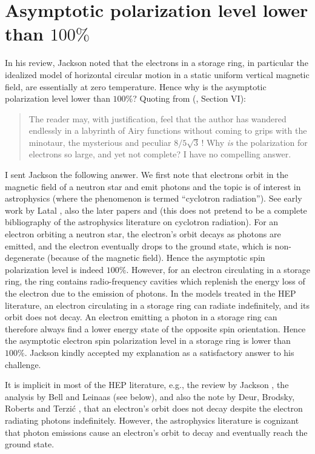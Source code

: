 \documentclass[review]{elsarticle}
\theoremstyle{plain}
\begin{document}
\section{Asymptotic polarization level lower than $100\%$}\label{sec:Plt1}
In his review, Jackson \cite{JacksonRMP} noted that the electrons in a storage ring,
in particular the idealized model of horizontal circular motion in a static uniform vertical magnetic field,
are essentially at zero temperature.
Hence why is the asymptotic polarization level lower than $100\%$?
Quoting from (\cite{JacksonRMP}, Section VI):
\begin{quote}
  The reader may, with justification, feel that the author has wandered endlessly in a labyrinth of Airy functions without coming to grips with the minotaur,
  the mysterious and peculiar $8/5\sqrt{3}$\,! Why \emph{is} the polarization for electrons so large, and yet not complete? I have no compelling answer.
\end{quote}
I sent Jackson the following answer.
We first note that electrons orbit in the magnetic field of a neutron star and emit photons
and the topic is of interest in astrophysics (where the phenomenon is termed ``cyclotron radiation'').
See early work by Latal \cite{Latal}, also the later papers \cite{BaringAstro} and \cite{SemionovaAstro}
(this does not pretend to be a complete bibliography of the astrophysics literature on cyclotron radiation).
For an electron orbiting a neutron star, the electron's orbit decays as photons are emitted, and the electron eventually drops to the ground state,
which is non-degenerate (because of the magnetic field).
Hence the asymptotic spin polarization level is indeed $100\%$.
However, for an electron circulating in a storage ring,
the ring contains radio-frequency cavities which replenish the energy loss of the electron due to the emission of photons.
In the models treated in the HEP literature, an electron circulating in a storage ring can radiate indefinitely, and its orbit does not decay.
An electron emitting a photon in a storage ring can therefore always find a lower energy state of the opposite spin orientation.
Hence the asymptotic electron spin polarization level in a storage ring is lower than $100\%$.
Jackson \cite{JDJprivcomm} kindly accepted my explanation as a satisfactory answer to his challenge.

It is implicit in most of the HEP literature, e.g., the review by Jackson \cite{JacksonRMP},
the analysis by Bell and Leinaas \cite{BL1987,BL1983} (see below), and also the note by
Deur, Brodsky, Roberts and Terzi{\'c} \cite{RUE}, that an electron's orbit does not decay despite the electron radiating photons indefinitely.
However, the astrophysics literature is cognizant that photon emissions cause an electron's orbit to decay and eventually reach the ground state.
\end{document}
